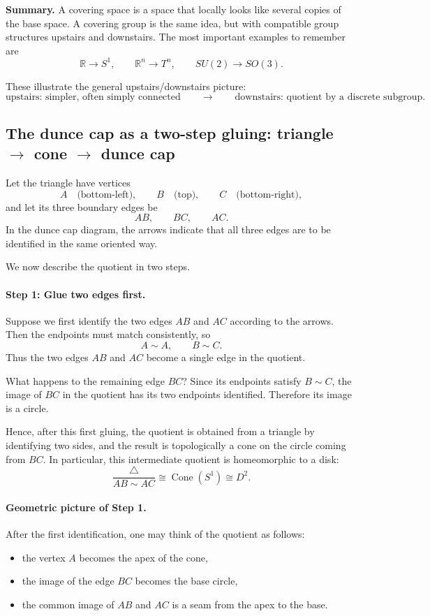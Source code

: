 \documentclass[12pt,a4paper]{article}
\theoremstyle{notespace}
\begin{document}
\medskip

\textbf{Summary.}
A covering space is a space that locally looks like several copies of the base space. A covering group is the same idea, but with compatible group structures upstairs and downstairs. The most important examples to remember are
\[
\mathbb R\to S^1,
\qquad
\mathbb R^n\to T^n,
\qquad
SU(2)\to SO(3).
\]

These illustrate the general upstairs/downstairs picture:
\[
\text{upstairs: simpler, often simply connected}
\qquad\longrightarrow\qquad
\text{downstairs: quotient by a discrete subgroup}.
\]








\subsection{The dunce cap as a two-step gluing: triangle \(\to\) cone \(\to\) dunce cap}

Let the triangle have vertices
\[
A \quad \text{(bottom-left)}, \qquad
B \quad \text{(top)}, \qquad
C \quad \text{(bottom-right)},
\]
and let its three boundary edges be
\[
AB,\qquad BC,\qquad AC.
\]
In the dunce cap diagram, the arrows indicate that all three edges are to be identified in the same oriented way.

We now describe the quotient in two steps.

\paragraph{Step 1: Glue two edges first.}
Suppose we first identify the two edges \(AB\) and \(AC\) according to the arrows. Then the endpoints must match consistently, so
\[
A \sim A, \qquad B \sim C.
\]
Thus the two edges \(AB\) and \(AC\) become a single edge in the quotient.

What happens to the remaining edge \(BC\)? Since its endpoints satisfy \(B \sim C\), the image of \(BC\) in the quotient has its two endpoints identified. Therefore its image is a circle.

Hence, after this first gluing, the quotient is obtained from a triangle by identifying two sides, and the result is topologically a cone on the circle coming from \(BC\). In particular, this intermediate quotient is homeomorphic to a disk:
\[
\frac{\triangle}{AB \sim AC} \cong \operatorname{Cone}(S^1) \cong D^2.
\]

\paragraph{Geometric picture of Step 1.}
After the first identification, one may think of the quotient as follows:
\begin{itemize}
	\item the vertex \(A\) becomes the apex of the cone,
	\item the image of the edge \(BC\) becomes the base circle,
	\item the common image of \(AB\) and \(AC\) is a seam from the apex to the base.
\end{itemize}
\end{document}

